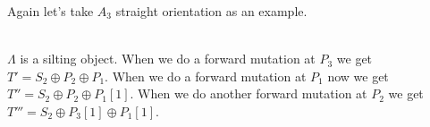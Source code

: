 \begin{example}
\indent Again let's take $A_3$ straight orientation as an example.\\
\\
\indent $\Lambda$ is a silting object. When we do a forward mutation at $P_3$ we get $T'=S_2\oplus P_2\oplus P_1$. When we do a forward mutation at $P_1$ now we get $T''=S_2\oplus P_2\oplus P_1[1]$. When we do another forward mutation at $P_2$ we get $T'''=S_2\oplus P_3[1]\oplus P_1[1]$.
\end{example}

